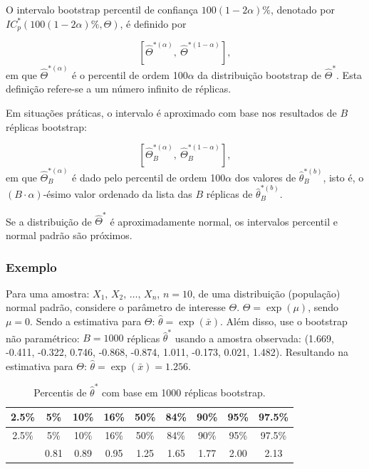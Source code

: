 \documentclass[
  letterpaper,
  DIV=11,
  numbers=noendperiod]{scrreprt}
\newcommand{\va}{$X_1,\,X_2,\,\dots,\,X_n$}
\begin{document}
O intervalo bootstrap percentil de confiança \(100(1-2\alpha)\%\),
denotado por \(IC_p^*\left(100(1-2\alpha)\%,\Theta \right)\), é definido
por

\[\left[ \hat\Theta^{*(\alpha)}, \ \hat\Theta^{*(1-\alpha)}\right],\] em
que \(\hat\Theta^{*(\alpha)}\) é o percentil de ordem 100\(\alpha\) da
distribuição bootstrap de \(\hat\Theta^*\). Esta definição refere-se a
um número infinito de réplicas.

Em situações práticas, o intervalo é aproximado com base nos resultados
de \(B\) réplicas bootstrap:

\[\left[ \hat\Theta_B^{*(\alpha)}, \ \hat\Theta_B^{*(1-\alpha)}\right],\]
em que \(\hat\Theta_B^{*(\alpha)}\) é dado pelo percentil de ordem
100\(\alpha\) dos valores de \(\hat\theta_B^{*(b)}\), isto é, o
\((B\cdot\alpha)\)-ésimo valor ordenado da lista das \(B\) réplicas de
\(\hat\theta_B^{*(b)}\).

\begin{tcolorbox}[enhanced jigsaw, left=2mm, toprule=.15mm, opacityback=0, title=\textcolor{quarto-callout-note-color}{\faInfo}\hspace{0.5em}{Nota}, leftrule=.75mm, breakable, colbacktitle=quarto-callout-note-color!10!white, coltitle=black, rightrule=.15mm, bottomtitle=1mm, toptitle=1mm, colframe=quarto-callout-note-color-frame, colback=white, opacitybacktitle=0.6, bottomrule=.15mm, arc=.35mm, titlerule=0mm]

Se a distribuição de \(\hat\Theta^{*}\) é aproximadamente normal, os
intervalos percentil e normal padrão são próximos.

\end{tcolorbox}

\subsubsection{Exemplo}\label{exemplo-8}

Para uma amostra: \va , \(n=10\), de uma distribuição (população) normal
padrão, considere o parâmetro de interesse \(\Theta\).
\(\Theta=\exp(\mu)\), sendo \(\mu=0\). Sendo a estimativa para
\(\Theta\): \(\hat{\theta}=\exp(\bar{x})\). Além disso, use o bootstrap
não paramétrico: \(B=1000\) réplicas \(\hat{\theta}^*\) usando a amostra
observada: (1.669, -0.411, -0.322, 0.746, -0.868, -0.874, 1.011, -0.173,
0.021, 1.482). Resultando na estimativa para \(\Theta\):
\(\hat{\theta}=\exp(\bar{x})=1.256\).

\begin{longtable}[]{@{}ccccccccc@{}}
\caption{Percentis de \(\hat\theta^*\) com base em 1000 réplicas
bootstrap.}\tabularnewline
\toprule\noalign{}
2.5\% & 5\% & 10\% & 16\% & 50\% & 84\% & 90\% & 95\% & 97.5\% \\
\midrule\noalign{}
\endfirsthead
\toprule\noalign{}
2.5\% & 5\% & 10\% & 16\% & 50\% & 84\% & 90\% & 95\% & 97.5\% \\
\midrule\noalign{}
\endhead
\bottomrule\noalign{}
\endlastfoot
0.74 & 0.81 & 0.89 & 0.95 & 1.25 & 1.65 & 1.77 & 2.00 & 2.13 \\
\end{longtable}
\end{document}
